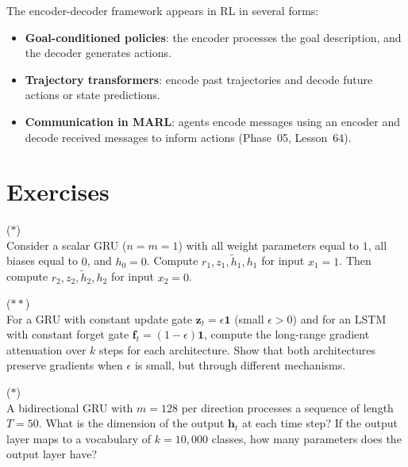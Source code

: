 \documentclass[11pt,a4paper]{article}
\begin{document}
\begin{rlconnection}[title={Encoder-Decoder in RL}]
The encoder-decoder framework appears in RL in several forms:
\begin{itemize}[nosep]
  \item \textbf{Goal-conditioned policies}: the encoder processes
    the goal description, and the decoder generates actions.
  \item \textbf{Trajectory transformers}: encode past trajectories
    and decode future actions or state predictions.
  \item \textbf{Communication in MARL}: agents encode messages using
    an encoder and decode received messages to inform actions
    (Phase~05, Lesson~64).
\end{itemize}
\end{rlconnection}

\section{Exercises}
\label{sec:exercises}

\begin{exercise}
\textnormal{(\(\ast\))} \\
Consider a scalar GRU ($n = m = 1$) with all weight parameters
equal to $1$, all biases equal to $0$, and $h_0 = 0$.  Compute
$r_1, z_1, \tilde{h}_1, h_1$ for input $x_1 = 1$.  Then compute
$r_2, z_2, \tilde{h}_2, h_2$ for input $x_2 = 0$.
\end{exercise}

\begin{exercise}
\textnormal{(\(\ast\ast\))} \\
For a GRU with constant update gate $\mathbf{z}_t = \epsilon
\mathbf{1}$ (small $\epsilon > 0$) and for an LSTM with constant
forget gate $\mathbf{f}_t = (1 - \epsilon)\mathbf{1}$, compute the
long-range gradient attenuation over $k$ steps for each
architecture.  Show that both architectures preserve gradients
when $\epsilon$ is small, but through different mechanisms.
\end{exercise}

\begin{exercise}
\textnormal{(\(\ast\))} \\
A bidirectional GRU with $m = 128$ per direction processes a
sequence of length $T = 50$.  What is the dimension of the output
$\mathbf{h}_t$ at each time step?  If the output layer maps to a
vocabulary of $k = 10{,}000$ classes, how many parameters does the
output layer have?
\end{exercise}
\end{document}
